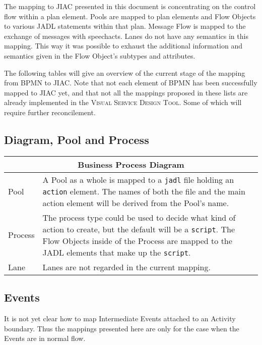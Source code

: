 The mapping to JIAC presented in this %
document is concentrating on the control flow within a plan element. Pools are mapped to plan elements and Flow Objects to various JADL statements within that plan. Message Flow is mapped to the exchange of messages with speechacts. Lanes do not have any semantics in this mapping. This way it was possible to exhaust the additional information and semantics given in the Flow Object's subtypes and attributes.

The following tables will give an overview of the current stage of the mapping from BPMN to JIAC. Note that not each element of BPMN has been successfully mapped to JIAC yet, and that not all the mappings proposed in these lists are already implemented in the \textsc{Visual Service Design Tool}. Some of which will require further reconcilement.

\newpage

\subsection{Diagram, Pool and Process}

\begin{longtable}{|p{3.5cm}|p{10.5cm}|}
\hline
\multicolumn{2}{|c|}{\textbf{Business Process Diagram}}
\\\hline
Pool                    &A Pool as a whole is mapped to a \verb|jadl| file holding an \verb|action| element. The names of both the file and the main action element will be derived from the Pool's name.
\\\hline
Process                 & The process type could be used to decide what kind of action to create, but the default will be a \verb|script|. The Flow Objects inside of the Process are mapped to the JADL elements that make up the \verb|script|.
\\\hline
Lane                    & Lanes are not regarded in the current mapping.
\\\hline
\end{longtable}


\subsection{Events}
It is not yet clear how to map Intermediate Events attached to an Activity boundary. Thus the mappings presented here are only for the case when the Events are in normal flow.

